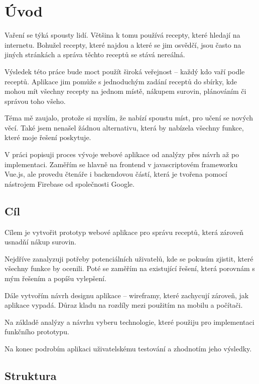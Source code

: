 
\chapter{Úvod}

Vaření se týká spousty lidí. Většina k tomu používá recepty, které hledají na internetu. Bohužel recepty, které najdou
a které se jim osvědčí, jsou často na jiných stránkách a správa těchto receptů se stává nereálná.

Výsledek této práce bude moct použít široká veřejnost -- každý kdo vaří podle receptů. Aplikace jim pomůže s jednoduchým
zadání receptů do sbírky, kde mohou mít všechny recepty na jednom místě, nákupem surovin, plánováním či správou toho všeho.

Téma mě zaujalo, protože si myslím, že nabízí spoustu míst, pro učení se nových věcí. Také jsem nenašel žádnou alternativu,
která by nabízela všechny funkce, které moje řešení poskytuje.

V práci popisuji proces vývoje webové aplikace od analýzy přes návrh až po implementaci. Zaměřím se hlavně na frontend v
javascriptovém frameworku Vue.js, ale provedu čtenáře i backendovou částí, která je tvořena pomocí nástrojem Firebase od
společnosti Google.

\section{Cíl}
Cílem je vytvořit prototyp webové aplikace pro správu receptů, která zároveň usnadňí nákup surovin.

Nejdříve zanalyzuji potřeby potenciálních uživatelů, kde se pokusím zjistit, které všechny funkce by ocenili. Poté se
zaměřím na existující řešení, která porovnám s mým řešením a popíšu vylepšení.

Dále vytvořím návrh designu aplikace -- wireframy, které zachycují zároveň, jak aplikace vypadá. Důraz kladu na rozdíly
mezi použitím na mobilu a počítači.

Na základě analýzy a návrhu vyberu technologie, které použiju pro implementaci funkčního prototypu.

Na konec podrobím aplikaci uživatelskému testování a zhodnotím jeho výsledky.

\section{Struktura}
